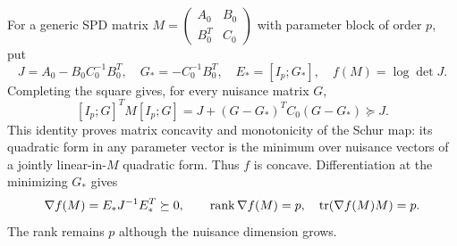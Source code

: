 For a generic SPD matrix
$M=\left(\begin{smallmatrix}A_0&B_0\\B_0^T&C_0\end{smallmatrix}\right)$
with parameter block of order $p$, put
\[
 J=A_0-B_0C_0^{-1}B_0^T,\quad G_*=-C_0^{-1}B_0^T,
 \quad E_*=[I_p;G_*],\quad f(M)=\log\det J.
\]
Completing the square gives, for every nuisance matrix $G$,
\begin{equation}\label{eq:schur-variational}
 [I_p;G]^TM[I_p;G]
 =J+(G-G_*)^TC_0(G-G_*)\succeq J.
\end{equation}
This identity proves matrix concavity and monotonicity of the Schur map:
its quadratic form in any parameter vector is the minimum over nuisance
vectors of a jointly linear-in-$M$ quadratic form. Thus $f$ is concave.
Differentiation at the minimizing $G_*$ gives
\begin{equation}\label{eq:separator-gradient}
 \nabla f(M)=E_*J^{-1}E_*^T\succeq0,
 \qquad \operatorname{rank}\nabla f(M)=p,\quad
 \operatorname{tr}(\nabla f(M)M)=p.
\end{equation}
The rank remains $p$ although the nuisance dimension grows.

